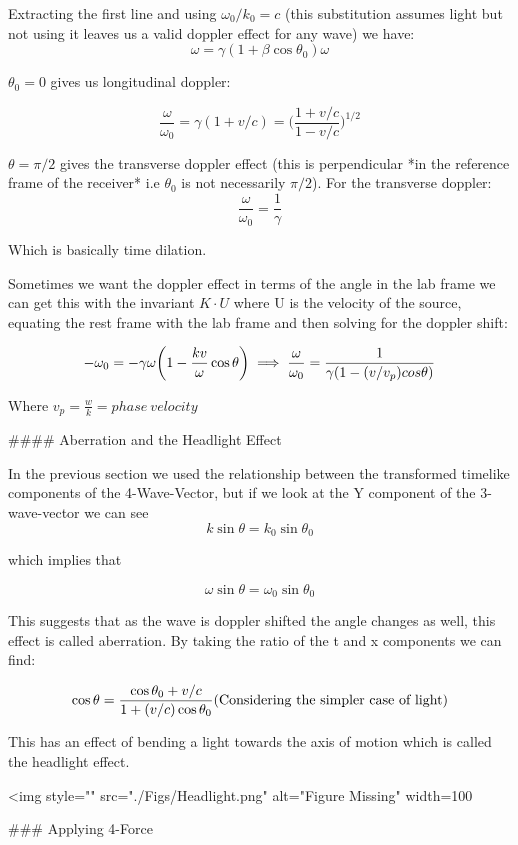 Extracting the first line and using $\omega_0/k_0 = c$ (this substitution assumes light but not using it leaves us a valid doppler effect for any wave) we have:
$$
\omega = \gamma(1+\beta\cos\theta_0)\omega
$$

$\theta_0 = 0$ gives us longitudinal doppler:

$$
\frac{\omega}{\omega_0} = \gamma(1 + v/c) = \bigg(\frac{1+v/c}{1-v/c}\bigg)^{1/2}
$$

$\theta = \pi/2$ gives the transverse doppler effect (this is perpendicular *in the reference frame of the receiver* i.e $\theta_0$ is not necessarily $\pi/2$). For the transverse doppler:
$$
\frac{\omega}{\omega_0} = \frac{1}{\gamma}
$$

Which is basically time dilation.

Sometimes we want the doppler effect in terms of the angle in the lab frame we can get this with the invariant $K\cdot U$ where U is the velocity of the source, equating the rest frame with the lab frame and then solving for the doppler shift:

$$
-\omega_0 = -\gamma\omega\bigg(1 - \frac{kv}{\omega}\cos\theta\bigg)\\
\implies \frac{\omega}{\omega_0} = \frac{1}{\gamma(1 - (v/v_p)cos\theta)}
$$

Where $v_p=\frac{w}{k}=phase\ velocity$

#### Aberration and the Headlight Effect

In the previous section we used the relationship between the transformed timelike components of the 4-Wave-Vector, but if we look at the Y component of the 3-wave-vector we can see
$$
k\sin\theta = k_0\sin\theta_0
$$

which implies that

$$
\omega\sin\theta = \omega_0\sin\theta_0
$$

This suggests that as the wave is doppler shifted the angle changes as well, this effect is called aberration. By taking the ratio of the t and x components we can find:

$$
\cos\theta = \frac{\cos\theta_0 + v/c}{1 + (v/c)\cos\theta_0}\\
\text{(Considering the simpler case of light)}
$$

This has an effect of bending a light towards the axis of motion which is called the headlight effect.

<img style="" src="./Figs/Headlight.png" alt="Figure Missing" width=100%

### Applying 4-Force

